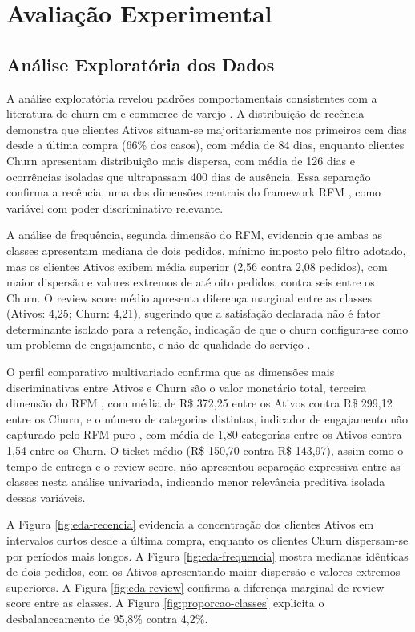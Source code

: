 \chapter{Avaliação Experimental} \label{Cap:AvaliacaoExperimental}

\FloatBarrier
\section{Análise Exploratória dos Dados} \label{sec:eda}

A análise exploratória revelou padrões comportamentais consistentes com a literatura de churn em e-commerce de varejo \cite{matuszelanski2022}. A distribuição de recência demonstra que clientes Ativos situam-se majoritariamente nos primeiros cem dias desde a última compra (66\% dos casos), com média de 84 dias, enquanto clientes Churn apresentam distribuição mais dispersa, com média de 126 dias e ocorrências isoladas que ultrapassam 400 dias de ausência. Essa separação confirma a recência, uma das dimensões centrais do framework RFM \cite{hughes1994}, como variável com poder discriminativo relevante.

A análise de frequência, segunda dimensão do RFM, evidencia que ambas as classes apresentam mediana de dois pedidos, mínimo imposto pelo filtro adotado, mas os clientes Ativos exibem média superior (2,56 contra 2,08 pedidos), com maior dispersão e valores extremos de até oito pedidos, contra seis entre os Churn. O review score médio apresenta diferença marginal entre as classes (Ativos: 4,25; Churn: 4,21), sugerindo que a satisfação declarada não é fator determinante isolado para a retenção, indicação de que o churn configura-se como um problema de engajamento, e não de qualidade do serviço \cite{manzoor2024}.

O perfil comparativo multivariado confirma que as dimensões mais discriminativas entre Ativos e Churn são o valor monetário total, terceira dimensão do RFM \cite{hughes1994}, com média de R\$ 372,25 entre os Ativos contra R\$ 299,12 entre os Churn, e o número de categorias distintas, indicador de engajamento não capturado pelo RFM puro \cite{manzoor2024}, com média de 1,80 categorias entre os Ativos contra 1,54 entre os Churn. O ticket médio (R\$ 150,70 contra R\$ 143,97), assim como o tempo de entrega e o review score, não apresentou separação expressiva entre as classes nesta análise univariada, indicando menor relevância preditiva isolada dessas variáveis.

A Figura \ref{fig:eda-recencia} evidencia a concentração dos clientes Ativos em intervalos curtos desde a última compra, enquanto os clientes Churn dispersam-se por períodos mais longos. A Figura \ref{fig:eda-frequencia} mostra medianas idênticas de dois pedidos, com os Ativos apresentando maior dispersão e valores extremos superiores. A Figura \ref{fig:eda-review} confirma a diferença marginal de review score entre as classes. A Figura \ref{fig:proporcao-classes} explicita o desbalanceamento de 95,8\% contra 4,2\%.


